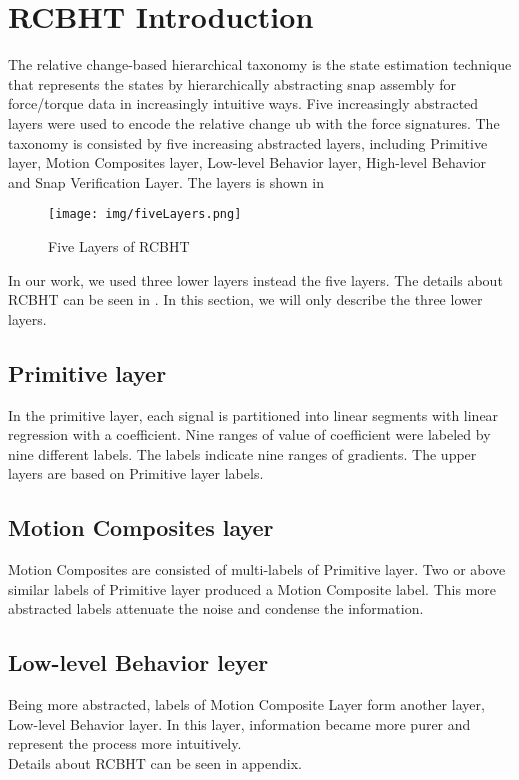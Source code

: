 \section{RCBHT Introduction}
The relative change-based hierarchical taxonomy is the state estimation technique that represents the states by hierarchically abstracting snap assembly for force/torque data in increasingly intuitive ways. Five increasingly abstracted layers were used to encode the relative change ub with the force signatures. The taxonomy is consisted by five increasing abstracted layers, including Primitive layer, Motion Composites layer, Low-level Behavior layer, High-level Behavior and Snap Verification Layer. The layers is shown in \\
\begin{figure}[h]
    \centering
    \texttt{[image: img/fiveLayers.png]}
    \caption{Five Layers of RCBHT}
    \label{RCBHT}
\end{figure} 
\indent In our work, we used three lower layers instead the five layers. The details about RCBHT can be seen in \cite{2012IROS-Rojas-RCBHT}. In this section, we will only describe the three lower layers.
\subsection{Primitive layer}
In the primitive layer, each signal is partitioned into linear segments with linear regression with a coefficient. Nine ranges of value of coefficient were labeled by nine different labels. The labels indicate nine ranges of gradients. The upper layers are based on Primitive layer labels.
\subsection{Motion Composites layer}
Motion Composites are consisted of multi-labels of Primitive layer. Two or above similar labels of Primitive layer produced a Motion Composite label. This more abstracted labels attenuate the noise and condense the information.
\subsection{Low-level Behavior leyer}
Being more abstracted, labels of Motion Composite Layer form another layer, Low-level Behavior layer. In this layer, information became more purer and represent the process more intuitively.\\

\indent Details about RCBHT can be seen in appendix.


